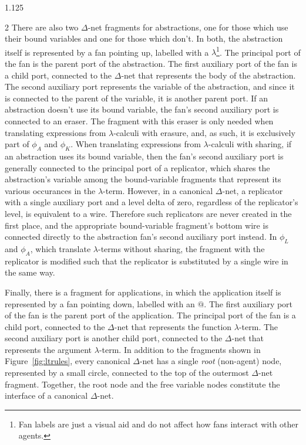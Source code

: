 \documentclass[10pt]{article}
\begin{document}
\begin{spacing}{1.125}
\begin{multicols}{2}
There are also two \mbox{$\Delta$-net} fragments for abstractions, one for those which use their bound variables and one for those which don't.
In both, the abstraction itself is represented by a fan pointing up, labelled with a $\lambda$\footnote{\label{visualaid}Fan labels are just a visual aid and do not affect how fans interact with other agents.}.
The principal port of the fan is the parent port of the abstraction.
The first auxiliary port of the fan is a child port, connected to the \mbox{$\Delta$-net} that represents the body of the abstraction. The second auxiliary port represents the variable of the abstraction, and since it is connected to the parent of the variable, it is another parent port.
If an abstraction doesn't use its bound variable, the fan's second auxiliary port is connected to an eraser.
The fragment with this eraser is only needed when translating expressions from \mbox{$\lambda$-calculi} with erasure, and, as such, it is exclusively part of $\phi_A$ and $\phi_K$.
When translating expressions from {$\lambda$-calculi} with sharing, if an abstraction uses its bound variable, then the fan's second auxiliary port is generally connected to the principal port of a replicator, which shares the abstraction's variable among the bound-variable fragments that represent its various occurances in the \mbox{$\lambda$-term}. However, in a canonical \mbox{$\Delta$-net}, a replicator with a single auxiliary port and a level delta of zero, regardless of the replicator's level, is equivalent to a wire. Therefore such replicators are never created in the first place, and the appropriate bound-variable fragment's bottom wire is connected directly to the abstraction fan's second auxiliary port instead.
In \mbox{$\phi_L$} and \mbox{$\phi_A$}, which translate \mbox{$\lambda$-terms} without sharing, the fragment with the replicator is modified such that the replicator is substituted by a single wire in the same way.

Finally, there is a fragment for applications, in which the application itself is represented by a fan pointing down, labelled with an $@$.
The first auxiliary port of the fan is the parent port of the application.
The principal port of the fan is a child port, connected to the \mbox{$\Delta$-net} that represents the function \mbox{$\lambda$-term}. The second auxiliary port is another child port, connected to the \mbox{$\Delta$-net} that represents the argument \mbox{$\lambda$-term}.
In addition to the fragments shown in \mbox{Figure \ref{fig:ltrules}}, every canonical \mbox{$\Delta$-net} has a single \textit{root} (non-agent) node, represented by a small circle, connected to the top of the outermost \mbox{$\Delta$-net} fragment.
Together, the root node and the free variable nodes constitute the interface of a canonical \mbox{$\Delta$-net}.


\end{multicols}
\end{spacing}
\end{document}
